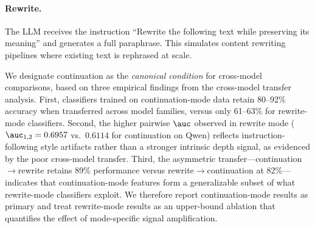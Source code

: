 \paragraph{Rewrite.}
The LLM receives the instruction ``Rewrite the following text while preserving its meaning'' and generates a full paraphrase.
This simulates content rewriting pipelines where existing text is rephrased at scale.

We designate continuation as the \emph{canonical condition} for cross-model comparisons, based on three empirical findings from the cross-model transfer analysis.
First, classifiers trained on continuation-mode data retain 80--92\% accuracy when transferred across model families, versus only 61--63\% for rewrite-mode classifiers.
Second, the higher pairwise $\auc$ observed in rewrite mode ($\auc_{1,2} = 0.6957$ vs.\ $0.6114$ for continuation on Qwen) reflects instruction-following style artifacts rather than a stronger intrinsic depth signal, as evidenced by the poor cross-model transfer.
Third, the asymmetric transfer---continuation${\to}$rewrite retains 89\% performance versus rewrite${\to}$continuation at 82\%---indicates that continuation-mode features form a generalizable subset of what rewrite-mode classifiers exploit.
We therefore report continuation-mode results as primary and treat rewrite-mode results as an upper-bound ablation that quantifies the effect of mode-specific signal amplification.
